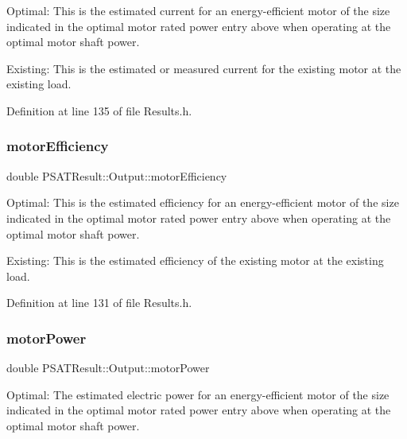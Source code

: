 Optimal\+: This is the estimated current for an energy-\/efficient motor of the size indicated in the optimal motor rated power entry above when operating at the optimal motor shaft power. 

Existing\+: This is the estimated or measured current for the existing motor at the existing load. 

Definition at line 135 of file Results.\+h.

\mbox{\label{struct_p_s_a_t_result_1_1_output_ad1beb6e9a1fc9bc21c50eb42ae598589}} 
\subsubsection{\texorpdfstring{motor\+Efficiency}{motorEfficiency}}
{\footnotesize\ttfamily double P\+S\+A\+T\+Result\+::\+Output\+::motor\+Efficiency}



Optimal\+: This is the estimated efficiency for an energy-\/efficient motor of the size indicated in the optimal motor rated power entry above when operating at the optimal motor shaft power. 

Existing\+: This is the estimated efficiency of the existing motor at the existing load. 

Definition at line 131 of file Results.\+h.

\mbox{\label{struct_p_s_a_t_result_1_1_output_a531700e73ed9cc95d1dd4b2d58030ffb}} 
\subsubsection{\texorpdfstring{motor\+Power}{motorPower}}
{\footnotesize\ttfamily double P\+S\+A\+T\+Result\+::\+Output\+::motor\+Power}



Optimal\+: The estimated electric power for an energy-\/efficient motor of the size indicated in the optimal motor rated power entry above when operating at the optimal motor shaft power. 

